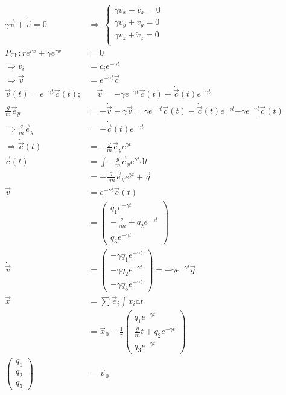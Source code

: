 \documentclass[12pt,a4paper,notitlepage]{article}
\newcommand{\diff}{\mathrm{d}}
\begin{document}
\begin{align}
\gamma\vec v+\dot{\vec v}=0\:&\Rightarrow\:\left\{\begin{matrix}
\gamma v_x+\dot v_x=0\\
\gamma v_y+\dot v_y=0\\
\gamma v_z+\dot v_z=0\\
\end{matrix}\right.\\
P_\text{Ch}:re^{rx}+\gamma e^{rx}&=0\\
\Rightarrow v_i&=c_ie^{-\gamma t}\\
\Rightarrow \vec v&=e^{-\gamma t}\vec c\\
\vec v(t)=e^{-\gamma t}\vec c(t);&\quad\dot{\vec v}=-\gamma e^{-\gamma t}\vec c(t)+\dot{\vec c}(t)e^{-\gamma t}\\
\frac{g}{m}\vec e_y&=-\dot{\vec v}-\gamma\vec v=\underline{\gamma e^{-\gamma t}\vec c(t)}-\dot{\vec c}(t)e^{-\gamma t}\underline{-\gamma e^{-\gamma t}\vec c(t)}\\
\Rightarrow\frac{g}{m}\vec e_y&=-\dot\vec c(t)e^{-\gamma t}\\
\Rightarrow\dot{\vec c}(t)&=-\frac{g}{m}\vec e_ye^{\gamma t}\\
\vec c(t)&=\int-\frac{g}{m}\vec e_ye^{\gamma t}\diff t\\
&=-\frac{g}{\gamma m}\vec e_ye^{\gamma t}+\vec q\\
\vec v&=e^{-\gamma t}\vec c(t)\\
&=\left(\begin{matrix}
q_1e^{-\gamma t}\\
-\frac{g}{\gamma m}+q_2e^{-\gamma t}\\
q_3e^{-\gamma t}
\end{matrix}\right)\\
\dot{\vec v}&=\left(\begin{matrix}
-\gamma q_1e^{-\gamma t}\\
-\gamma q_2e^{-\gamma t}\\
-\gamma q_3e^{-\gamma t}
\end{matrix}\right)=-\gamma e^{-\gamma t}\vec q\\
\vec x&=\sum\vec e_i\int\dot x_i\diff t\\
&=\vec x_0-\frac{1}{\gamma}\left(\begin{matrix}
q_1e^{-\gamma t}\\
\frac{g}{m}t+q_2e^{-\gamma t}\\
q_3e^{-\gamma t}
\end{matrix}\right)\\
\left(\begin{matrix}
q_1\\q_2\\q_3
\end{matrix}\right)&=\vec v_0
\end{align}
\end{document}
